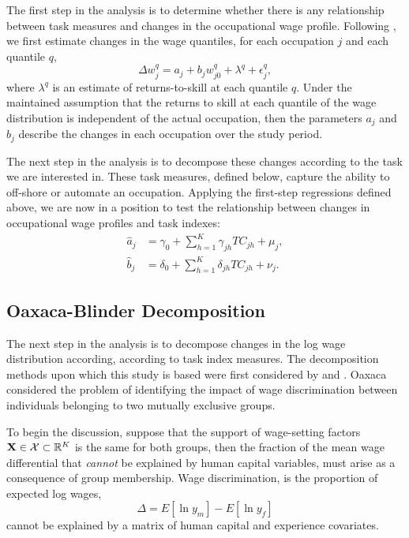 The first step in the analysis is to determine whether there is any relationship between task measures and changes in the occupational wage profile. Following \citet{Juhn1993}, we first estimate changes in the wage quantiles, for each occupation $j$ and each quantile $q$,
$$ \Delta w_j^q = a_j + b_jw_{j0}^q + \lambda^q + \epsilon^q_j, $$
where $\lambda^q$ is an estimate of returns-to-skill at each quantile $q$. Under the maintained assumption that the returns to skill at each quantile of the wage distribution is independent of the actual occupation, then the parameters $a_j$ and $b_j$ describe the changes in each occupation over the study period.

The next step in the analysis is to decompose these changes according to the task we are interested in. These task measures, defined below, capture the ability to off-shore or automate an occupation. Applying the first-step regressions defined above, we are now in a position to test the relationship between changes in occupational wage profiles and task indexes:
\begin{align}
  \hat{a}_j &= \gamma_0 + \sum_{h=1}^K\gamma_{jh}TC_{jh} + \mu_j, \\
  \hat{b}_j &= \delta_0 + \sum_{h=1}^K\delta_{jh}TC_{jh} + \nu_j.
\end{align}

\subsection{Oaxaca-Blinder Decomposition}
The next step in the analysis is to decompose changes in the log wage distribution according, according to task index measures. The decomposition methods upon which this study is based were first considered by \citet{Oaxaca1973} and \citet{Blinder1973}. Oaxaca considered the problem of identifying the impact of wage discrimination between individuals belonging to two mutually exclusive groups. 

To begin the discussion, suppose that the support of wage-setting factors $\mathbf{X}\in\mathcal{X}\subset\mathbb{R}^K$ is the same for both groups, then the fraction of the mean wage differential that {\em cannot} be explained by human capital variables, must arise as a consequence of group membership. Wage discrimination, is the proportion of expected log wages,
\begin{equation} \Delta = E[\ln y_m] - E[\ln y_f] \label{eq:odec} \end{equation}
cannot be explained by a matrix of human capital and experience covariates.

